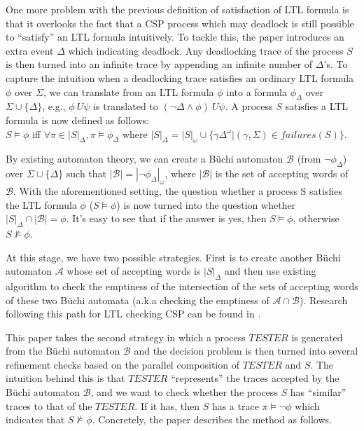 \documentclass{llncs}
\begin{document}
One more problem with the previous definition of satisfaction of LTL formula
is that it overlooks the fact that a CSP process which may deadlock
is still possible to ``satisfy'' an LTL formula intuitively. To tackle this, the
paper introduces an extra event $\Delta$ which indicating deadlock. Any
deadlocking trace of the process $S$ is then turned into an infinite trace by
appending an infinite number of $\Delta$'s. To capture the intuition when a
deadlocking trace satisfies an ordinary LTL formula $\phi$ over $\Sigma$, we can
translate from an LTL formula $\phi$ into a formula $\phi_{\Delta}$ over $\Sigma \cup \{\Delta\}$,
e.g., $\phi\ U \psi$ is translated to $(\neg \Delta \land \phi)\ U \psi$.
A process $S$ satisfies a LTL formula is now defined as follows:
\\$S \models \phi$ iff $\forall \pi \in|S|_\Delta, \pi \models \phi_{\Delta}$
where $|S|_{\Delta} = |S|_{\omega} \cup \{\gamma\Delta^{\omega} | (\gamma,
\Sigma) \in failures(S)\}$.

By existing automaton theory, we can create a B\"uchi automaton $\mathcal{B}$
(from $\neg \phi_{\Delta}$)
over $\Sigma \cup \{\Delta\}$ such that $|\mathcal{B}| =
|\neg \phi_{\Delta}|_\omega$, where $|\mathcal{B}|$ is the set of accepting words of
$\mathcal{B}$. With the aforementioned setting, the question whether a process
S satisfies the LTL formula $\phi$ ($S \models
\phi$) is now turned into the question whether $|S|_{\Delta} \cap |\mathcal{B}| 
= \phi$. It's easy to see that if the answer is yes, then $S \models \phi$, otherwise $S
\not\models \phi$.

At this stage, we have two possible strategies. First is to create another
B\"uchi automaton $\mathcal{A}$ whose set of accepting words is $|S|_{\Delta}$
and then use existing algorithm to check the emptiness of the intersection of
the sets of accepting words of these two B\"uchi automata (a.k.a checking the
emptiness of $\mathcal{A}
\cap \mathcal{B}$). Research following this path for LTL checking CSP 
can be found in \cite{Sun2009Model}.

This paper takes the second strategy in which a process $TESTER$ is generated from the B\"uchi automaton
$\mathcal{B}$ and the decision problem is then turned into several refinement
checks based on the parallel composition of $TESTER$ and $S$. The intuition
behind this is that $TESTER$ ``represents'' the traces accepted by the B\"uchi
automaton $\mathcal{B}$, and we want to check whether the process $S$ has
``similar'' traces to that of the $TESTER$. If it has, then $S$ has a trace $\pi
\models \neg \phi$ which indicates that $S \not\models \phi$. Concretely, the paper 
describes the method as follows.
\end{document}

